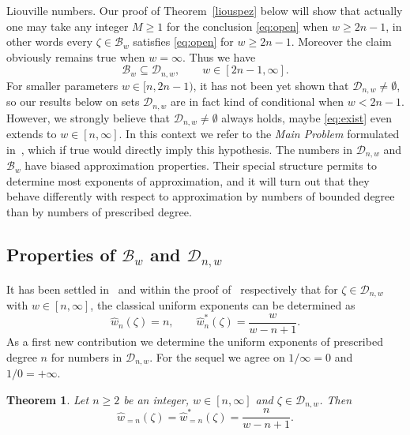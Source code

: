 \documentclass[12pt]{amsart}
\newtheorem{theorem}{Theorem}[section]
\theoremstyle{definition}
\begin{document}
Liouville numbers.
Our proof of Theorem~\ref{liouspez} below will show that actually one may take any integer $M\geq 1$ for the conclusion \eqref{eq:open} when $w\geq 2n-1$, in 
other words every $\zeta\in \mathscr{B}_{w}$ satisfies \eqref{eq:open} for $w\geq 2n-1$. 
Moreover the claim obviously remains true when $w=\infty$.
Thus we have
%
\begin{equation} \label{eq:exist}
\mathscr{B}_{w}\subseteq \mathscr{D}_{n,w}, \qquad w\in[2n-1,\infty].
\end{equation}
%
For smaller parameters $w\in[n,2n-1)$, it has not been yet shown 
that $\mathscr{D}_{n,w}\neq \emptyset$, so our results below
on sets $\mathscr{D}_{n,w}$ are in fact kind of 
conditional when $w<2n-1$.
However, we strongly believe that $\mathscr{D}_{n,w}\neq \emptyset$
always holds, maybe \eqref{eq:exist} even 
extends to $w\in[n,\infty]$.
In this context we refer to the {\em Main Problem} formulated in~\cite[Section~3.4, page~61]{bugbuch}, which if true would 
directly imply this hypothesis. 
The numbers in $\mathscr{D}_{n,w}$ and $\mathscr{B}_{w}$
have biased approximation properties.
Their special structure permits to determine most
exponents of approximation, and it will turn out that
they behave differently with respect to approximation by 
numbers of bounded degree
than by numbers of prescribed degree. 

\subsection{Properties of $\mathscr{B}_{w}$ and $\mathscr{D}_{n,w}$}
\label{neurey}
It has been settled in~\cite[Theorem~5.1]{j3} and
within the proof of~\cite[Theorem~5.6]{bdraft} respectively
that for $\zeta\in\mathscr{D}_{n,w}$ with $w\in[n,\infty]$, the 
classical uniform exponents can be determined as
%
\begin{equation} \label{eq:kannt}
\widehat{w}_{n}(\zeta)=n, \qquad \widehat{w}_{n}^{\ast}(\zeta)
= \frac{w}{w-n+1}.
\end{equation}
%
As a first new contribution we determine the uniform 
exponents of prescribed degree $n$ for numbers in $\mathscr{D}_{n,w}$.
For the sequel we agree on $1/\infty=0$ and $1/0=+\infty$. 

\begin{theorem} \label{bs}
Let $n\geq 2$ be an integer, $w\in[n,\infty]$ and $\zeta\in\mathscr{D}_{n,w}$.
Then 
%
\begin{equation}  \label{eq:erstard}
\widehat{w}_{=n}(\zeta)=\widehat{w}_{=n}^{\ast}(\zeta)=\frac{n}{w-n+1}.
\end{equation}
%
\end{theorem}
\end{document}
